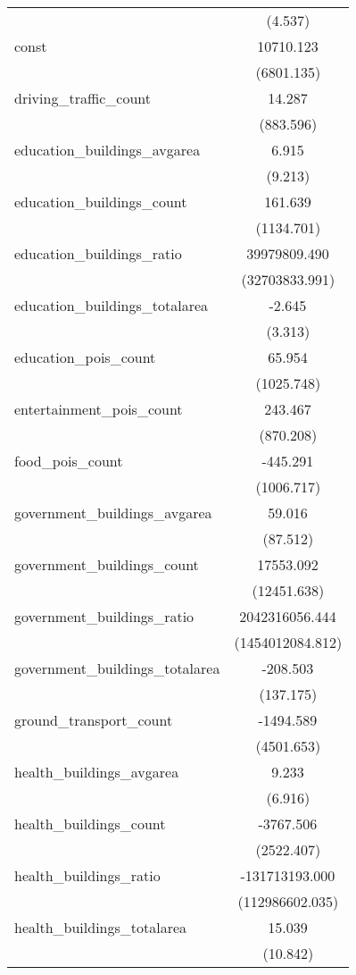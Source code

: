 \begin{table}[!htbp]
\begin{tabular}{@{\extracolsep{5pt}}lc}
  & (4.537) \\
 const & 10710.123$^{}$ \\
  & (6801.135) \\
 driving_traffic_count & 14.287$^{}$ \\
  & (883.596) \\
 education_buildings_avgarea & 6.915$^{}$ \\
  & (9.213) \\
 education_buildings_count & 161.639$^{}$ \\
  & (1134.701) \\
 education_buildings_ratio & 39979809.490$^{}$ \\
  & (32703833.991) \\
 education_buildings_totalarea & -2.645$^{}$ \\
  & (3.313) \\
 education_pois_count & 65.954$^{}$ \\
  & (1025.748) \\
 entertainment_pois_count & 243.467$^{}$ \\
  & (870.208) \\
 food_pois_count & -445.291$^{}$ \\
  & (1006.717) \\
 government_buildings_avgarea & 59.016$^{}$ \\
  & (87.512) \\
 government_buildings_count & 17553.092$^{}$ \\
  & (12451.638) \\
 government_buildings_ratio & 2042316056.444$^{}$ \\
  & (1454012084.812) \\
 government_buildings_totalarea & -208.503$^{}$ \\
  & (137.175) \\
 ground_transport_count & -1494.589$^{}$ \\
  & (4501.653) \\
 health_buildings_avgarea & 9.233$^{}$ \\
  & (6.916) \\
 health_buildings_count & -3767.506$^{}$ \\
  & (2522.407) \\
 health_buildings_ratio & -131713193.000$^{}$ \\
  & (112986602.035) \\
 health_buildings_totalarea & 15.039$^{}$ \\
  & (10.842) \\

\end{tabular}
\end{table}
